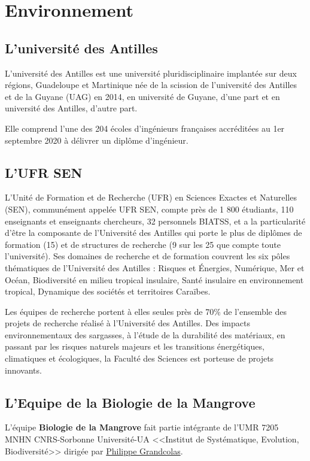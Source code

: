 \chapter{Environnement}
    \section{L'université des Antilles}
    L’université des Antilles est une université pluridisciplinaire implantée sur deux régions, Guadeloupe et Martinique née de la scission de l’université des Antilles et de la Guyane (UAG) en 2014, en université de Guyane, d’une part et en université des Antilles, d’autre part.

    \vspace{0.5cm}

    Elle comprend l'une des 204 écoles d'ingénieurs françaises accréditées au 1er septembre 2020 à délivrer un diplôme d'ingénieur.

    \section{L'UFR SEN}
    L’Unité de Formation et de Recherche (UFR) en Sciences Exactes et Naturelles (SEN), communément appelée UFR SEN, compte près de 1 800 étudiants, 110 enseignants et enseignants chercheurs, 32 personnels BIATSS, et a la particularité d’être la composante de l’Université des Antilles qui porte le plus de diplômes de formation (15) et de structures de recherche (9 sur les 25 que compte toute l’université). 
    Ses domaines de recherche et de formation couvrent les six pôles thématiques de l’Université des Antilles : Risques et Énergies, Numérique, Mer et Océan, Biodiversité en milieu tropical insulaire, Santé insulaire en environnement tropical, Dynamique des sociétés et territoires Caraïbes.

    \vspace{0.5cm}

    Les équipes de recherche portent à elles seules près de 70\% de l’ensemble des projets de recherche réalisé à l’Université des Antilles.
    Des impacts environnementaux des sargasses, à l’étude de la durabilité des matériaux, en passant par les risques naturels majeurs et les transitions énergétiques, climatiques et écologiques, la Faculté des Sciences est porteuse de projets innovants. 


    \section{L'Equipe de la Biologie de la Mangrove}
    L'équipe \textbf{Biologie de la Mangrove} fait partie intégrante de l'UMR 7205 MNHN CNRS-Sorbonne Université-UA <<Institut de Systématique, Evolution, Biodiversité>> dirigée par \underline{Philippe Grandcolas}.

